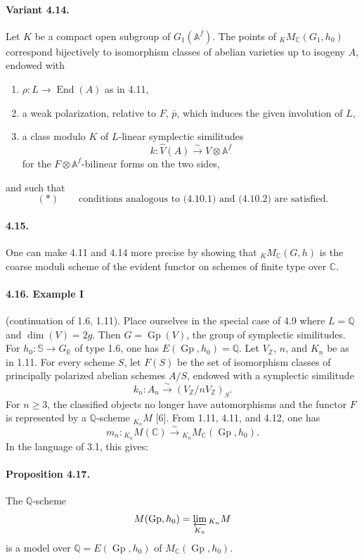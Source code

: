 \documentclass[10pt]{article}
\newcommand{\Af}{\mathbb A^f}
\newcommand{\C}{\mathbb C}
\newcommand{\Q}{\mathbb Q}
\newcommand{\R}{\mathbb R}
\newcommand{\Z}{\mathbb Z}
\newcommand{\bS}{\mathbb S}
\newcommand{\Gp}{\operatorname{Gp}}
\newcommand{\End}{\operatorname{End}}
\begin{document}
\paragraph{Variant 4.14.} Let $K$ be a compact open subgroup of $G_1(\Af)$. The points of ${}_K M_{\C}(G_1,h_0)$ correspond bijectively to isomorphism classes of abelian varieties up to isogeny $A$, endowed with
\begin{enumerate}[label=(\alph*)]
\item $\rho:L\longrightarrow\End(A)$ as in 4.11,
\item a weak polarization, relative to $F$, $\bar p$, which induces the given involution of $L$,
\item a class modulo $K$ of $L$-linear symplectic similitudes
\[
k:\widehat V(A)\xrightarrow{\sim}V\otimes\Af
\]
for the $F\otimes\Af$-bilinear forms on the two sides,
\end{enumerate}
and such that
\[
(*)\qquad\text{conditions analogous to (4.10.1) and (4.10.2) are satisfied.}
\]

\paragraph{4.15.} One can make 4.11 and 4.14 more precise by showing that ${}_K M_{\C}(G,h)$ is the coarse moduli scheme of the evident functor on schemes of finite type over $\C$.

\paragraph{4.16. Example I} (continuation of 1.6, 1.11). Place ourselves in the special case of 4.9 where $L=\Q$ and $\dim(V)=2g$. Then $G=\Gp(V)$, the group of symplectic similitudes. For $h_0:\bS\to G_\R$ of type 1.6, one has $E(\Gp,h_0)=\Q$. Let $V_\Z$, $n$, and $K_n$ be as in 1.11. For every scheme $S$, let $F(S)$ be the set of isomorphism classes of principally polarized abelian schemes $A/S$, endowed with a symplectic similitude
\[
k_n:A_n\xrightarrow{\sim}(V_\Z/nV_\Z)_S.
\]
For $n\ge3$, the classified objects no longer have automorphisms and the functor $F$ is represented by a $\Q$-scheme ${}_{K_n}M$ [6]. From 1.11, 4.11, and 4.12, one has
\[
m_n:{}_{K_n}M(\C)\xrightarrow{\sim}{}_{K_n}M_{\C}(\Gp,h_0).
\]
In the language of 3.1, this gives:

\paragraph{Proposition 4.17.} The $\Q$-scheme
\[
M(\Gp,h_0)=\varprojlim_{K_n}{}_{K_n}M
\]
is a model over $\Q=E(\Gp,h_0)$ of $M_{\C}(\Gp,h_0)$.
\end{document}
